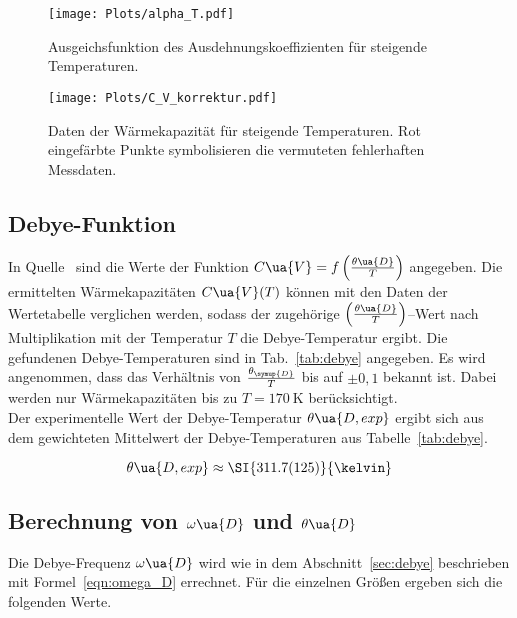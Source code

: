 \begin{figure}[h]
  \centering
  \texttt{[image: Plots/alpha\_T.pdf]}
  \caption{Ausgeichsfunktion des Ausdehnungskoeffizienten für steigende Temperaturen.}
  \label{fig:alpha}
\end{figure}



\FloatBarrier
\begin{figure}
  \centering
  \texttt{[image: Plots/C\_V\_korrektur.pdf]}
  \caption{Daten der Wärmekapazität für steigende Temperaturen. Rot eingefärbte Punkte symbolisieren die vermuteten fehlerhaften Messdaten.}
  \label{fig:c_v}
\end{figure}

\subsection{Debye-Funktion}

In Quelle~\cite{anleitung} sind die Werte der Funktion $C\ua{V} = f\left(\frac{\theta\ua{D}}{T}\right)$
angegeben. Die ermittelten Wärmekapazitäten $C\ua{V}(T)$ können
mit den Daten der Wertetabelle verglichen werden, sodass
der zugehörige $\left(\frac{\theta\ua{D}}{T}\right)$--Wert nach Multiplikation
mit der Temperatur $T$ die Debye-Temperatur ergibt.
Die gefundenen Debye-Temperaturen sind in Tab.~\ref{tab:debye} angegeben.
Es wird angenommen, dass das Verhältnis von $\frac{\theta_{\symup{D}}}{T}$
bis auf $\pm 0,1$ bekannt ist.
Dabei werden nur Wärmekapazitäten bis zu $T = \SI{170}{\kelvin}$ berücksichtigt.\\
Der experimentelle Wert der Debye-Temperatur $\theta\ua{D, exp}$ ergibt sich aus dem gewichteten Mittelwert
der Debye-Temperaturen aus Tabelle~\ref{tab:debye}.

\begin{equation}
  \label{eqn:debye}
  \theta\ua{D, exp} \approx \SI{311.7(125)}{\kelvin}
\end{equation}

\subsection{Berechnung von $\omega\ua{D}$ und $\theta\ua{D}$}

Die Debye-Frequenz $\omega\ua{D}$ wird wie in dem Abschnitt~\ref{sec:debye} beschrieben mit Formel~\eqref{eqn:omega_D}
errechnet.
Für die einzelnen Größen ergeben sich die folgenden Werte.

